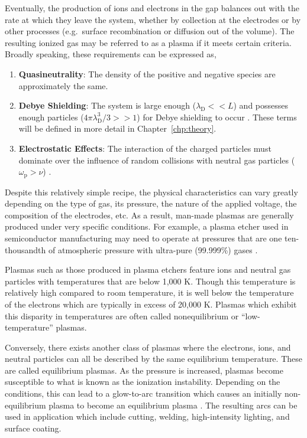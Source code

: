 Eventually, the production of ions and electrons in the gap balances out with
the rate at which they leave the system, whether by collection at the electrodes
or by other processes (e.g.\ surface recombination or diffusion out of the
volume). The resulting ionized gas may be referred to as a plasma if it meets
certain criteria. Broadly speaking, these requirements can be expressed as,
\begin{enumerate}
  \item \textbf{Quasineutrality}: The density of the positive and negative
species are approximately the same.
  \item \textbf{Debye Shielding}: The system is large enough ($\lambda_\mathrm{D} 
<< L$) and possesses enough particles ($4\pi\lambda_\mathrm{D}^3/3 >> 1$) for
Debye shielding to occur \cite{Chen1984}. These terms will be defined in more
detail in Chapter~\ref{chp:theory}.
  \item \textbf{Electrostatic Effects}: The interaction of the charged particles
must dominate over the influence of random collisions with neutral gas particles
($\omega_\mathrm{p} > \nu$) \cite{Chen1984}.
\end{enumerate}

Despite this relatively simple recipe, the physical characteristics can vary
greatly depending on the type of gas, its pressure, the nature of the applied
voltage, the composition of the electrodes, etc. As a result, man-made plasmas
are generally produced under very specific conditions. For example, a plasma
etcher used in semiconductor manufacturing may need to operate at pressures that
are one ten-thousandth of atmospheric pressure with ultra-pure (99.999\%) gases
\cite{Greenberg1993a}.

Plasmas such as those produced in plasma etchers feature ions and neutral gas
particles with temperatures that are below 1,000 K. Though this temperature is
relatively high compared to room temperature, it is well below the temperature
of the electrons which are typically in excess of 20,000 K. Plasmas which
exhibit this disparity in temperatures are often called nonequilibrium or
``low-temperature'' plasmas.

Conversely, there exists another class of plasmas where the electrons, ions, and
neutral particles can all be described by the same equilibrium temperature.
These are called equilibrium plasmas. As the pressure is increased, plasmas
become susceptible to what is known as the ionization instability. Depending on
the conditions, this can lead to a glow-to-arc transition which causes an
initially non-equilibrium plasma to become an equilibrium plasma
\cite{Kunhardt2000}. The resulting arcs can be used in application which include
cutting, welding, high-intensity lighting, and surface coating.

